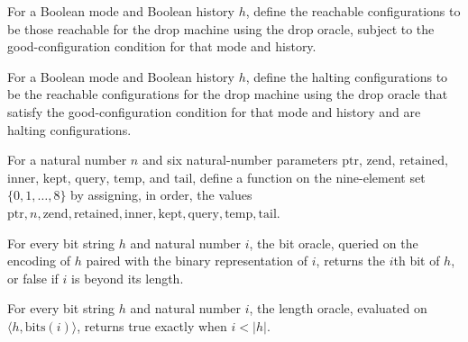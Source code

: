 \begin{definition}
\label{Complexity.DropReach}
\leanok
{}
For a Boolean mode and Boolean history $h$, define the reachable configurations to be
those reachable for the drop machine using the drop oracle, subject to the
good-configuration condition for that mode and history.
\end{definition}

\begin{definition}
\label{Complexity.DropHalt}
\leanok
{}
For a Boolean mode and Boolean history $h$, define the halting configurations to be the
reachable configurations for the drop machine using the drop oracle that satisfy the
good-configuration condition for that mode and history and are halting configurations.
\end{definition}

\begin{definition}
\label{Complexity.dropValues}
\leanok
For a natural number $n$ and six natural-number parameters $\mathrm{ptr}$,
$\mathrm{zend}$, $\mathrm{retained}$, $\mathrm{inner}$, $\mathrm{kept}$,
$\mathrm{query}$, $\mathrm{temp}$, and $\mathrm{tail}$, define a function on the
nine-element set $\{0,1,\ldots,8\}$ by assigning, in order, the values $\mathrm{ptr}, n,
\mathrm{zend}, \mathrm{retained}, \mathrm{inner}, \mathrm{kept}, \mathrm{query},
\mathrm{temp}, \mathrm{tail}$.
\end{definition}

\begin{lemma}
\label{Complexity.drop_bit}
\leanok
{}
For every bit string $h$ and natural number $i$, the bit oracle, queried on the encoding
of $h$ paired with the binary representation of $i$, returns the $i$th bit of $h$, or
false if $i$ is beyond its length.
\end{lemma}

\begin{lemma}
\label{Complexity.drop_len}
\leanok
{}
For every bit string $h$ and natural number $i$, the length oracle, evaluated on
$\langle h,\mathrm{bits}(i)\rangle$, returns true exactly when $i<|h|$.
\end{lemma}

